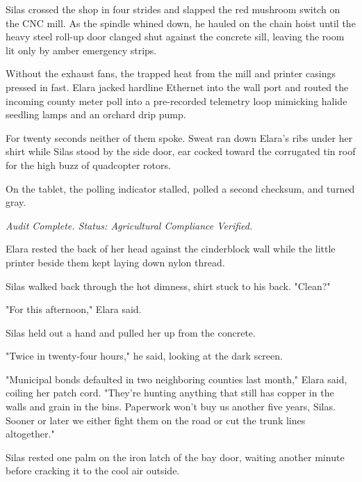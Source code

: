 Silas crossed the shop in four strides and slapped the red mushroom switch on the CNC mill. As the spindle whined down, he hauled on the chain hoist until the heavy steel roll-up door clanged shut against the concrete sill, leaving the room lit only by amber emergency strips.

Without the exhaust fans, the trapped heat from the mill and printer casings pressed in fast. Elara jacked hardline Ethernet into the wall port and routed the incoming county meter poll into a pre-recorded telemetry loop mimicking halide seedling lamps and an orchard drip pump.

For twenty seconds neither of them spoke. Sweat ran down Elara's ribs under her shirt while Silas stood by the side door, ear cocked toward the corrugated tin roof for the high buzz of quadcopter rotors.

On the tablet, the polling indicator stalled, polled a second checksum, and turned gray.

\textit{Audit Complete. Status: Agricultural Compliance Verified.}

Elara rested the back of her head against the cinderblock wall while the little printer beside them kept laying down nylon thread.

Silas walked back through the hot dimness, shirt stuck to his back. "Clean?"

"For this afternoon," Elara said.

Silas held out a hand and pulled her up from the concrete.

"Twice in twenty-four hours," he said, looking at the dark screen.

"Municipal bonds defaulted in two neighboring counties last month," Elara said, coiling her patch cord. "They're hunting anything that still has copper in the walls and grain in the bins. Paperwork won't buy us another five years, Silas. Sooner or later we either fight them on the road or cut the trunk lines altogether."

Silas rested one palm on the iron latch of the bay door, waiting another minute before cracking it to the cool air outside.
